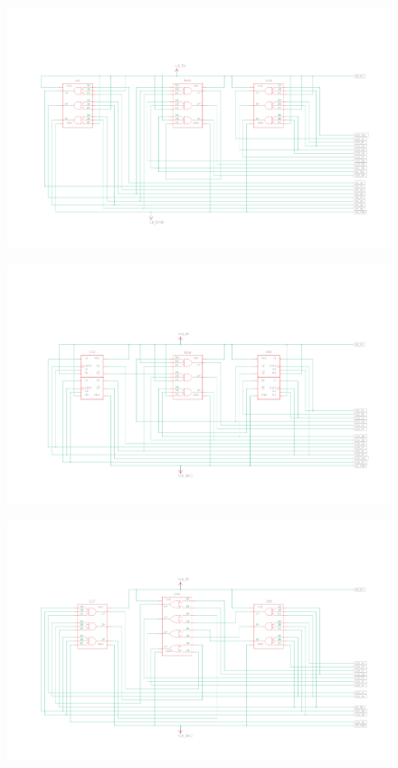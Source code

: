 \documentclass[a4paper,12pt]{article}
\begin{document}
\begin{figure}[H]
\centering    
\includegraphics[width=1\textwidth]{figs/c4.png}
\caption{}
\end{figure}
\begin{figure}[H]
\centering    
\includegraphics[width=1\textwidth]{figs/c5.png}
\caption{}
\end{figure}
\begin{figure}[H]
\centering    
\includegraphics[width=1\textwidth]{figs/c6.png}
\caption{}
\end{figure}
\end{document}
